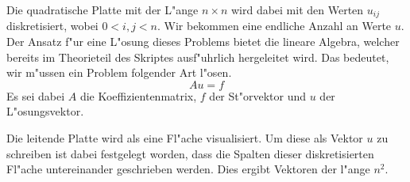 \begin{refsection}
Die quadratische Platte mit der L"ange $n\times n$ wird dabei mit
den Werten $u_{ij}$ diskretisiert, wobei $0 < i,j<n$. Wir bekommen
eine endliche Anzahl an Werte $u$.
Der Ansatz f"ur eine L"osung dieses Problems bietet die lineare
Algebra, welcher bereits im Theorieteil des Skriptes ausf"uhrlich
hergeleitet wird. Das bedeutet, wir m"ussen ein Problem folgender
Art l"osen.
\begin{equation}
Au = f
\end{equation}
Es sei dabei $A$ die Koeffizientenmatrix, $f$ der St"orvektor und
$u$ der L"osungsvektor.
	
Die leitende Platte wird als eine Fl"ache visualisiert. Um diese
als Vektor $u$ zu schreiben ist dabei festgelegt worden, dass die
Spalten dieser diskretisierten Fl"ache untereinander geschrieben
werden. Dies ergibt Vektoren der l"ange $n^2$.
	

\end{refsection}
